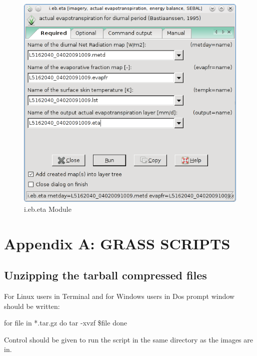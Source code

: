 \begin{figure}[htbp]
   \centering
   \includegraphics[scale=0.4]{gipe029.png}
   \caption{i.eb.eta Module}
   \label{fig:gipe029}
\end{figure}

\newpage


\section{Appendix A: GRASS SCRIPTS}
\label{appendixA}

\subsection{Unzipping the tarball compressed files}

For Linux users in Terminal and for Windows users in Dos prompt window should be written:\newline

\begin{smallverbatim}
for file in *.tar.gz
do
tar -xvzf \$file
done
\end{smallverbatim}

Control should be given to run the script in the same directory as the images are in.\newline

